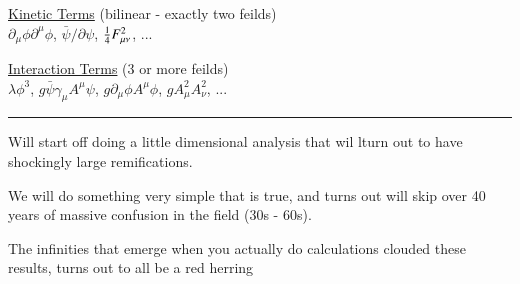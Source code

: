 {\underline{Kinetic Terms} (bilinear - exactly two feilds) \\
$\partial_\mu \phi \partial^\mu \phi$,  $\bar{\psi} \slash{\partial} \psi$, $\frac{1}{4} F_{\mu\nu}^2$,  ... 

\underline{Interaction Terms} (3 or more feilds)\\
$\lambda \phi^3$, $g\bar{\psi}\gamma_\mu A^\mu\psi$, $g\partial_\mu\phi A^\mu\phi$,  $gA_\mu^2A_\nu^2$, ...

\noindent\rule{\textwidth}{1pt}

Will start off doing a little dimensional analysis that wil lturn out to have shockingly large remifications. 

We will do something very simple that is true, and turns out will skip over 40 years of massive confusion in the field (30s - 60s). 

The infinities that emerge when you actually do calculations clouded these results, turns out to all be a red herring



}




